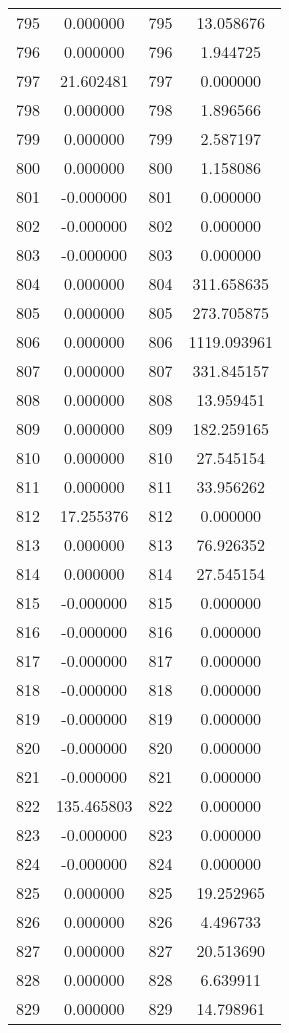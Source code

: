 \documentclass[12pt]{article}
\begin{document}
\begin{longtable}{@{}cccc@{}}
795 & 0.000000 & 795 & 13.058676 \\
796 & 0.000000 & 796 & 1.944725 \\
797 & 21.602481 & 797 & 0.000000 \\
798 & 0.000000 & 798 & 1.896566 \\
799 & 0.000000 & 799 & 2.587197 \\
800 & 0.000000 & 800 & 1.158086 \\
801 & -0.000000 & 801 & 0.000000 \\
802 & -0.000000 & 802 & 0.000000 \\
803 & -0.000000 & 803 & 0.000000 \\
804 & 0.000000 & 804 & 311.658635 \\
805 & 0.000000 & 805 & 273.705875 \\
806 & 0.000000 & 806 & 1119.093961 \\
807 & 0.000000 & 807 & 331.845157 \\
808 & 0.000000 & 808 & 13.959451 \\
809 & 0.000000 & 809 & 182.259165 \\
810 & 0.000000 & 810 & 27.545154 \\
811 & 0.000000 & 811 & 33.956262 \\
812 & 17.255376 & 812 & 0.000000 \\
813 & 0.000000 & 813 & 76.926352 \\
814 & 0.000000 & 814 & 27.545154 \\
815 & -0.000000 & 815 & 0.000000 \\
816 & -0.000000 & 816 & 0.000000 \\
817 & -0.000000 & 817 & 0.000000 \\
818 & -0.000000 & 818 & 0.000000 \\
819 & -0.000000 & 819 & 0.000000 \\
820 & -0.000000 & 820 & 0.000000 \\
821 & -0.000000 & 821 & 0.000000 \\
822 & 135.465803 & 822 & 0.000000 \\
823 & -0.000000 & 823 & 0.000000 \\
824 & -0.000000 & 824 & 0.000000 \\
825 & 0.000000 & 825 & 19.252965 \\
826 & 0.000000 & 826 & 4.496733 \\
827 & 0.000000 & 827 & 20.513690 \\
828 & 0.000000 & 828 & 6.639911 \\
829 & 0.000000 & 829 & 14.798961 \\

\end{longtable}
\end{document}
